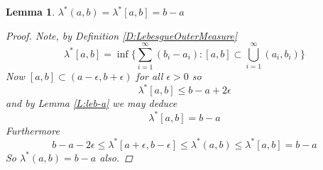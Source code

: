 \documentclass[12pt]{article}
\newtheorem{lemma}[theorem]{Lemma}
\begin{document}
\begin{lemma} \label{L:b-a}
	$\lambda^*(a,b) = \lambda^*[a,b] = b - a$
	\begin{proof}
		Note, by Definition \ref{D:LebesgueOuterMeasure}
		$$\lambda^*[a,b] =  \inf\{\sum_{i=1}^\infty(b_i - a_i) : [a,b] \subset \bigcup_{i=1}^\infty(a_i,b_i)\}$$
		Now $[a, b] \subset (a - \epsilon, b + \epsilon)$ for all $\epsilon > 0$ so
		$$\lambda^*[a,b] \le b - a + 2\epsilon$$
		and by Lemma \ref{L:leb-a} we may deduce
		$$\lambda^*[a,b] = b - a$$
		Furthermore
		$$b - a  - 2\epsilon \le \lambda^*[a+\epsilon, b - \epsilon] \le \lambda^*(a,b) \le \lambda^*[a,b] = b - a$$
		So $\lambda^*(a,b) = b - a$ also.
	\end{proof}
\end{lemma}
\end{document}
